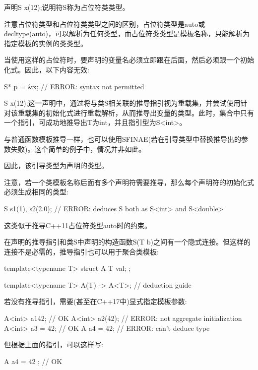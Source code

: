声明S x(12);说明符S称为占位符类类型。

\begin{notice}
注意占位符类型和占位符类类型之间的区别，占位符类型是auto或decltype(auto)，可以解析为任何类型，而占位符类类型是模板名称，只能解析为指定模板的实例的类类型。
\end{notice}

当使用这样的占位符时，要声明的变量名必须立即跟在后面，然后必须跟一个初始化式。因此，以下内容无效:
	
\begin{cpp}
S* p = &x; // ERROR: syntax not permitted
\end{cpp}

S x(12);这一声明中，通过将与类S相关联的推导指引视为重载集，并尝试使用针对该重载集的初始化式进行重载解析，从而推导出变量的类型。此时，集合中只有一个指引，可成功地推导出T为int，并且指引型为S<int>。

\begin{notice}
与普通函数模板推导一样，也可以使用SFINAE(若在引导类型中替换推导出的参数失败)。这个简单的例子中，情况并非如此。
\end{notice}

因此，该引导类型为声明的类型。

注意，若一个类模板名称后面有多个声明符需要推导，那么每个声明符的初始化式必须生成相同的类型:

\begin{cpp}
S s1(1), s2(2.0); // ERROR: deduces S both as S<int> and S<double>
\end{cpp}

这类似于推导C++11占位符类型auto时的约束。

在声明的推导指引和类S中声明的构造函数S(T b)之间有一个隐式连接。但这样的连接不是必需的，推导指引也可以用于聚合类模板:

\begin{cpp}
template<typename T>
struct A
{
	T val;
};

template<typename T> A(T) -> A<T>; // deduction guide
\end{cpp}

若没有推导指引，需要(甚至在C++17中)显式指定模板参数:

\begin{cpp}
A<int> a1{42}; // OK
A<int> a2(42); // ERROR: not aggregate initialization
A<int> a3 = {42}; // OK
A a4 = 42; // ERROR: can't deduce type
\end{cpp}

但根据上面的指引，可以这样写:

\begin{cpp}
A a4 = { 42 }; // OK
\end{cpp}

